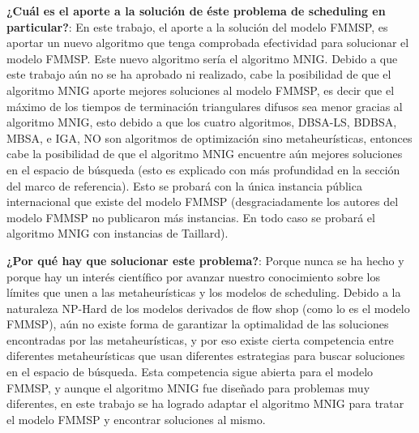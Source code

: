 \documentclass{article}
\begin{document}
\vspace{\baselineskip}
\textbf{¿Cuál es el aporte a la solución de éste problema de scheduling en particular?}: En este trabajo, el aporte a la solución del modelo FMMSP, es aportar un nuevo algoritmo que tenga comprobada efectividad para solucionar el modelo FMMSP. Este nuevo algoritmo sería el algoritmo MNIG. Debido a que este trabajo aún no se ha aprobado ni realizado, cabe la posibilidad de que el algoritmo MNIG aporte mejores soluciones al modelo FMMSP, es decir que el máximo de los tiempos de terminación triangulares difusos sea menor gracias al algoritmo MNIG, esto debido a que los cuatro algoritmos, DBSA-LS, BDBSA, MBSA, e IGA, NO son algoritmos de optimización sino metaheurísticas, entonces cabe la posibilidad de que el algoritmo MNIG encuentre aún mejores soluciones en el espacio de búsqueda (esto es explicado con más profundidad en la sección del marco de referencia). Esto se probará con la única instancia pública internacional que existe del modelo FMMSP (desgraciadamente los autores del modelo FMMSP no publicaron más instancias. En todo caso se probará el algoritmo MNIG con instancias de Taillard).

\vspace{\baselineskip}
\textbf{¿Por qué hay que solucionar este problema?}: Porque nunca se ha hecho y porque hay un interés científico por avanzar nuestro conocimiento sobre los límites que unen a las metaheurísticas y los modelos de scheduling. Debido a la naturaleza NP-Hard de los modelos derivados de flow shop (como lo es el modelo FMMSP), aún no existe forma de garantizar la optimalidad de las soluciones encontradas por las metaheurísticas, y por eso existe cierta competencia entre diferentes metaheurísticas que usan diferentes estrategias para buscar soluciones en el espacio de búsqueda. Esta competencia sigue abierta para el modelo FMMSP, y aunque el algoritmo MNIG fue diseñado para problemas muy diferentes, en este trabajo se ha logrado adaptar el algoritmo MNIG para tratar el modelo FMMSP y encontrar soluciones al mismo.
\end{document}
